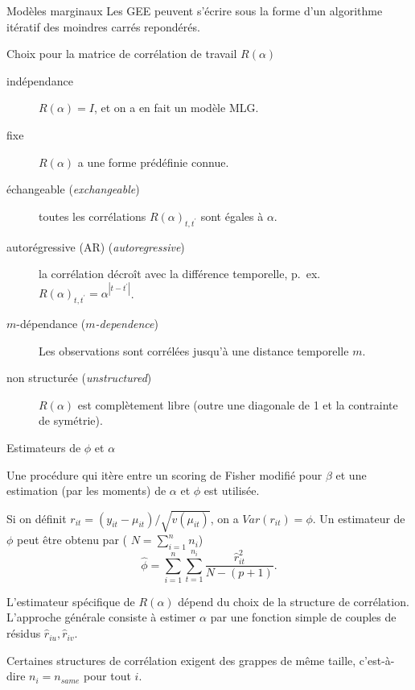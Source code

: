\documentclass{BeamerTemplate}
\begin{document}
\begin{refsection}
\begin{frame}[allowframebreaks]{Modèles marginaux}
\bigskip
Les GEE peuvent s'écrire sous la forme d'un algorithme itératif des moindres carrés repondérés.
\end{frame}

\begin{frame}{Choix pour la matrice de corrélation de travail $R(\alpha)$}
\begin{description}
\item[{\color{blue}indépendance}] $R(\alpha)=I$, et on a en fait un
  modèle MLG.
\item[{\color{blue}fixe}] $R(\alpha)$ a une forme prédéfinie connue.
\item[{\color{blue}échangeable} (\textit{exchangeable})] toutes les corrélations $R(\alpha)_{t,t^\prime}$
sont égales à $\alpha$.
\item[{\color{blue}autorégressive (AR)} (\textit{autoregressive})] la corrélation décroît avec
  la différence temporelle, p.~ex.\ $R(\alpha)_{t,t^\prime} = \alpha^{|t-t^\prime|}$.
\item[{\color{blue}$m$-dépendance} (\textit{$m$-dependence})] Les observations sont corrélées jusqu'à
  une distance temporelle $m$.
\item[{\color{blue}non structurée} (\textit{unstructured})] $R(\alpha)$ est
  complètement libre (outre une diagonale de 1 et la contrainte de symétrie).
\end{description}
\end{frame}

\begin{frame}{Estimateurs de $\phi$ et $\alpha$}

Une procédure qui itère entre un
scoring de Fisher modifié pour $\beta$ et une estimation (par les moments) de
$\alpha$ et $\phi$ est utilisée.

\bigskip
Si on définit $r_{it} = (y_{it} -
\mu_{it})/\sqrt{v(\mu_{it})}$, on a
$Var(r_{it}) = \phi$. Un estimateur de $\phi$ peut être
obtenu par ( $N=\sum_{i=1}^n n_i$)
$$\hat{\phi} = \sum_{i=1}^n \sum_{t=1}^{n_i}
\frac{\hat{r}_{it}^2}{N-(p+1)}.$$

\smallskip
L'estimateur spécifique de $R(\alpha)$ dépend du choix de la
structure de corrélation. L'approche générale consiste à estimer $\alpha$ par
une fonction simple de couples de résidus $\hat{r}_{iu}, \hat{r}_{iv}$.

\smallskip
Certaines structures de corrélation exigent des grappes de même taille, c'est-à-dire
$n_i = n_{same}$ pour tout $i$.
\end{frame}


\end{refsection}
\end{document}
